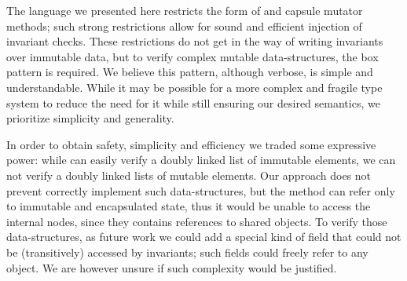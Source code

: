 







The language we presented here restricts the form of \Q@invariant@ and capsule mutator methods;
such strong restrictions allow for sound and efficient injection of invariant checks. 
These restrictions do not get in the way of writing invariants over immutable data, but to verify complex mutable data-structures, the box pattern is required. We believe this pattern, although verbose, is simple and understandable. While it may be possible for a more complex and fragile type system to reduce the need for it  while still ensuring our desired semantics, we prioritize simplicity and generality. 

In order to obtain safety, simplicity and efficiency we traded some expressive power:
while can easily verify a doubly linked list of immutable elements,
we can not verify a doubly linked lists of mutable elements. Our approach does not prevent correctly implement such data-structures, but the \Q@invariant@ method can refer only to immutable and encapsulated state, thus it would be unable to access the internal nodes, since they contains \Q@mut@ references to shared objects.
To verify those data-structures, as future work we could add a special kind of field that could not be (transitively) accessed by invariants; such fields could freely refer to any object. We are however unsure if such complexity would be justified.


